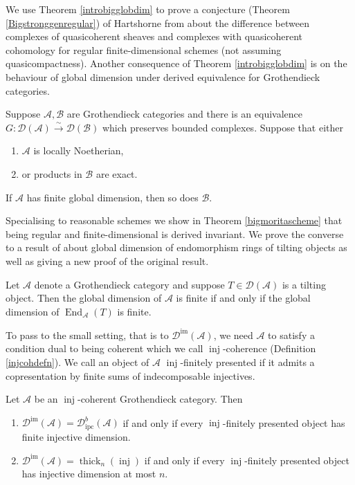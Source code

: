 \documentclass[12pt,oneside]{amsart}
\DeclareMathOperator{\End}{End}
\DeclareMathOperator{\thick}{thick}
\DeclareMathOperator{\inj}{inj}
\DeclareMathOperator{\immac}{im}
\DeclareMathOperator{\ipscoh}{ipc}
\begin{document}
We use Theorem \ref{introbigglobdim} to prove a conjecture (Theorem \ref{Bigstronggenregular}) of Hartshorne from \cite{Har66} about the difference between complexes of quasicoherent sheaves and complexes with quasicoherent cohomology for regular finite-dimensional schemes (not assuming quasicompactness). Another consequence of Theorem \ref{introbigglobdim} is on the behaviour of global dimension under derived equivalence for Grothendieck categories. 

\begin{theorem}
Suppose $\mathcal{A}, \mathcal{B}$ are Grothendieck categories and there is an equivalence $G \colon \mathcal{D}(\mathcal{A}) \xrightarrow{\sim} \mathcal{D}(\mathcal{B})$ which preserves bounded complexes. Suppose that either 
\begin{enumerate}
\item $\mathcal{A}$ is locally Noetherian,

\item or products in $\mathcal{B}$ are exact.
\end{enumerate}
If $\mathcal{A}$ has finite global dimension, then so does $\mathcal{B}$. 
\end{theorem}

Specialising to reasonable schemes we show in Theorem \ref{bigmoritascheme} that being regular and finite-dimensional is derived invariant. We prove the converse to a result of \cite{BK20} about global dimension of endomorphism rings of tilting objects as well as giving a new proof of the original result.

\begin{theorem} Let $\mathcal{A}$ denote a Grothendieck category and suppose $T \in \mathcal{D}(\mathcal{A})$ is a tilting object. Then the global dimension of $\mathcal{A}$ is finite if and only if the global dimension of $\End_{\mathcal{A}}(T)$ is finite.  
\end{theorem}

To pass to the small setting, that is to $\mathcal{D}^{\immac}(\mathcal{A})$, we need $\mathcal{A}$ to satisfy a condition dual to being coherent which we call $\inj$-coherence (Definition \ref{injcohdefn}). We call an object of $\mathcal{A}$ $\inj$-finitely presented if it admits a copresentation by finite sums of indecomposable injectives. 

\begin{theorem} \label{introsmallglobdim}
Let $\mathcal{A}$ be an $\inj$-coherent Grothendieck category. Then 
\begin{enumerate}
\item $\mathcal{D}^{\immac}(\mathcal{A}) = \mathcal{D}^b_{\ipscoh}(\mathcal{A})$ if and only if every $\inj$-finitely presented object has finite injective dimension.

\item $\mathcal{D}^{\immac}(\mathcal{A}) = \thick_n(\inj)$ if and only if every $\inj$-finitely presented object has injective dimension at most $n$.
\end{enumerate}
\end{theorem}
\end{document}
